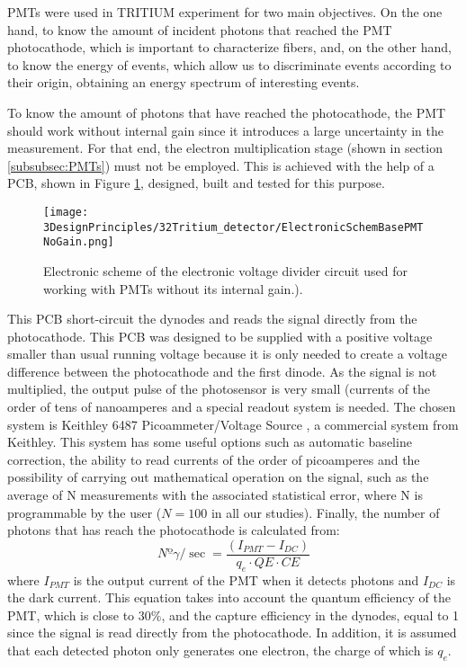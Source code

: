 PMTs were used in TRITIUM experiment for two main objectives. On the one hand, to know the amount of incident photons that reached the PMT photocathode, which is important to characterize fibers, and, on the other hand, to know the energy of events, which allow us to discriminate events according to their origin, obtaining an energy spectrum of interesting events. 

To know the amount of photons that have reached the photocathode, the PMT should work without internal gain since it introduces a large uncertainty in the measurement. For that end, the electron multiplication stage (shown in section \ref{subsubsec:PMTs}) must not be employed. This is achieved with the help of a PCB, shown in Figure \ref{fig:ElectronicSchemeBasePMTNoGain}, designed, built and tested for this purpose.  

\begin{figure}[htbp]
\centering
\texttt{[image: 3DesignPrinciples/32Tritium\_detector/ElectronicSchemBasePMTNoGain.png]}
\caption{Electronic scheme of the electronic voltage divider circuit used for working with PMTs without its internal gain.).\label{fig:ElectronicSchemeBasePMTNoGain}}
\end{figure}

This PCB short-circuit the dynodes and reads the signal directly from the photocathode. This PCB was designed to be supplied with a positive voltage smaller than usual running voltage because it is only needed to create a voltage difference between the photocathode and the first dinode. As the signal is not multiplied, the output pulse of the photosensor is very small (currents of the order of tens of nanoamperes and a special readout system is needed. The chosen system is Keithley 6487 Picoammeter/Voltage Source \cite{DataSheetKeithley6487}, a commercial system from Keithley. This system has some useful options such as automatic baseline correction, the ability to read currents of the order of picoamperes and the possibility of carrying out mathematical operation on the signal, such as the average of N measurements with the associated statistical error, where N is programmable by the user ($N=100$ in all our studies). Finally, the number of photons that has reach the photocathode is calculated from:
\begin{equation}
Nº\gamma/\sec = \frac{\left( I_{PMT} - I_{DC} \right)}{q_e \cdot{} QE \cdot{} CE}
\label{eq:NumPhotonsFromIntensityPMT}
\end{equation}
where $I_{PMT}$ is the output current of the PMT when it detects photons and $I_{DC}$ is the dark current. This equation takes into account the quantum efficiency of the PMT, which is close to $30\%$, and the capture efficiency in the dynodes, equal to 1 since the signal is read directly from the photocathode. In addition, it is assumed that each detected photon only generates one electron, the charge of which is $q_e$.

